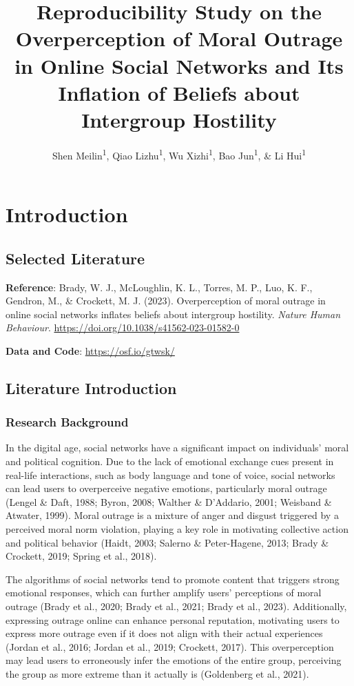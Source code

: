 \documentclass[
  man]{apa6}
\title{Reproducibility Study on the Overperception of Moral Outrage in Online Social Networks and Its Inflation of Beliefs about Intergroup Hostility}
\author{Shen Meilin\textsuperscript{1}, Qiao Lizhu\textsuperscript{1}, Wu Xizhi\textsuperscript{1}, Bao Jun\textsuperscript{1}, \& Li Hui\textsuperscript{1}}
\date{}
\affiliation{\vspace{0.5cm}\textsuperscript{1} School of Psychology, Nanjing Normal University}
\begin{document}
\maketitle

\hypertarget{introduction}{%
\section{Introduction}\label{introduction}}

\hypertarget{selected-literature}{%
\subsection{Selected Literature}\label{selected-literature}}

\textbf{Reference}: Brady, W. J., McLoughlin, K. L., Torres, M. P., Luo, K. F., Gendron, M., \& Crockett, M. J. (2023). Overperception of moral outrage in online social networks inflates beliefs about intergroup hostility. \emph{Nature Human Behaviour}. \url{https://doi.org/10.1038/s41562-023-01582-0}

\textbf{Data and Code}: \url{https://osf.io/gtwsk/}

\hypertarget{literature-introduction}{%
\subsection{Literature Introduction}\label{literature-introduction}}

\hypertarget{research-background}{%
\subsubsection{Research Background}\label{research-background}}

In the digital age, social networks have a significant impact on individuals' moral and political cognition. Due to the lack of emotional exchange cues present in real-life interactions, such as body language and tone of voice, social networks can lead users to overperceive negative emotions, particularly moral outrage (Lengel \& Daft, 1988; Byron, 2008; Walther \& D'Addario, 2001; Weisband \& Atwater, 1999). Moral outrage is a mixture of anger and disgust triggered by a perceived moral norm violation, playing a key role in motivating collective action and political behavior (Haidt, 2003; Salerno \& Peter-Hagene, 2013; Brady \& Crockett, 2019; Spring et al., 2018).

The algorithms of social networks tend to promote content that triggers strong emotional responses, which can further amplify users' perceptions of moral outrage (Brady et al., 2020; Brady et al., 2021; Brady et al., 2023). Additionally, expressing outrage online can enhance personal reputation, motivating users to express more outrage even if it does not align with their actual experiences (Jordan et al., 2016; Jordan et al., 2019; Crockett, 2017). This overperception may lead users to erroneously infer the emotions of the entire group, perceiving the group as more extreme than it actually is (Goldenberg et al., 2021).
\end{document}
